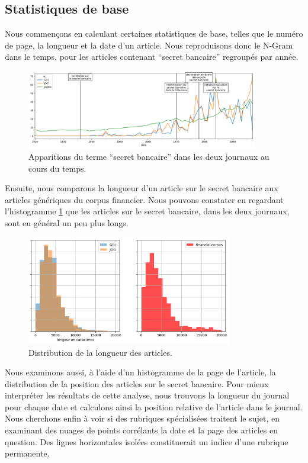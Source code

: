 \documentclass[a4paper, 11pt]{article}
\begin{document}
\hypertarget{statistiques-de-base}{%
\subsection{Statistiques de base}\label{statistiques-de-base}}

Nous commençons en calculant certaines statistiques de base, telles que
le numéro de page, la longueur et la date d'un article. Nous
reproduisons donc le N-Gram dans le temps, pour les articles contenant
``secret bancaire'' regroupés par année.

\begin{figure}
\centering
\includegraphics[width=0.9\textwidth]{methodology/ngram_ts.png}
\caption{Apparitions du terme ``secret bancaire'' dans les deux journaux
au cours du temps.}
\end{figure}

Ensuite, nous comparons la longueur d'un article sur le secret bancaire aux
articles génériques du corpus financier. Nous pouvons constater en regardant
l'histogramme \ref{article_lengths} que les articles sur le secret bancaire,
dans les deux journaux, sont en général un peu plus longs.

\begin{figure}
\centering
\includegraphics[width=0.8\textwidth ]{methodology/article_lengths.png}
\caption{Distribution de la longueur des articles.}
\label{article_lengths}
\end{figure}

Nous examinons aussi, à l'aide d'un histogramme de la page de l'article,
la distribution de la position des articles sur le secret bancaire. Pour
mieux interpréter les résultats de cette analyse, nous trouvons la
longueur du journal pour chaque date et calculons ainsi la position
relative de l'article dans le journal. Nous cherchons enfin à voir si
des rubriques spécialisées traitent le sujet, en examinant des nuages de
points corrélants la date et la page des articles en question. Des lignes
horizontales isolées constituerait un indice d'une rubrique permanente.
\end{document}
